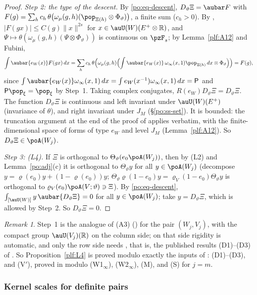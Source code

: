 \documentclass[10pt]{amsart}
\theoremstyle{definition}
\theoremstyle{remark}
\newtheorem{remark}[theorem]{Remark}
\newcommand{\R}{\mathbb R}
\begin{document}
\begin{proof}
\emph{Step 2: the type of the descent.} By \eqref{po:eq-descent}, $D_\vartheta\Xi=\aubar F$ with
$F(g)=\sum_hc_h\,\theta\bigl(\omega_\mu(g,h)(\pop_{\Xi(h)}\otimes\Phi_\vartheta)\bigr)$, a finite sum
($c_h>0$). By {\cite[Lemma~8.2]{P49}}, $|F(gx)|\le C(g)\|x\|^{2s}$ for $x\in\auU(W)(E^+\otimes\R)$, and
$\Psi\mapsto\theta(\omega_\mu(g,h)(\Psi\otimes\Phi_\vartheta))$ is continuous on $\pzF_s$; by
Lemma~\ref{plf:A12} and Fubini,
\[
\int\aubar{e_W(x)}F(gx)\,dx=\sum_hc_h\,\theta\Bigl(\omega_\mu(g,h)\Bigl(\int\aubar{e_W(x)}\,
\omega_\infty(x,1)\pop_{\Xi(h)}\,dx\otimes\Phi_\vartheta\Bigr)\Bigr)=F(g),
\]
since $\int\aubar{e_W(x)}\omega_\infty(x,1)\,dx=\int e_W(x^{-1})\omega_\infty(x,1)\,dx=\mathsf P$ and
$\mathsf P\pop_\xi=\pop_\xi$ by Step~1. Taking complex conjugates, $R(e_W)D_\vartheta\Xi=D_\vartheta\Xi$.
The function $D_\vartheta\Xi$ is continuous and left invariant under $\auU(W)(E^+)$ (invariance of
$\theta$), and right invariant under $J_M$ (\S\ref{po:ss-set}). It is bounded: the truncation
argument at the end of the proof of {\cite[Proposition~8.4(b)]{P49}} applies verbatim, with the
finite-dimensional space of forms of type $e_W$ and level $J_M$ (Lemma~\ref{plf:A12}). So
$D_\vartheta\Xi\in\poA(W_j)$.

\emph{Step 3: (L4).} If $\Xi$ is orthogonal to $\Theta_\vartheta(e_0\poA(W_j))$, then by (L2) and
Lemma~\ref{po:adj}(c) it is orthogonal to $\Theta_\vartheta y$ for all $y\in\poA(W_j)$ (decompose
$y=\varrho(e_0)y+(1-\varrho(e_0))y$; $\Theta_\vartheta\varrho(1-e_0)y=\varrho_V(1-e_0)\Theta_\vartheta y$
is orthogonal to $\varrho_V(e_0)\poA(V;\vartheta)\ni\Xi$). By \eqref{po:eq-descent},
$\int_{[\auU(W)]}y\,\aubar{D_\vartheta\Xi}=0$ for all $y\in\poA(W_j)$; take $y=D_\vartheta\Xi$, which is
allowed by Step~2. So $D_\vartheta\Xi=0$.
\end{proof}

\begin{remark}\label{plf:rem-L4}
Step~1 is the analogue of (A3) ({\cite[Theorem~3.15]{P49}}) for the pair $(W_j,V_j)$, with the compact
group $\auU(V_j)(\R)$ on the column side; on that side rigidity is automatic, and only the row side
needs {\cite[Lemma~3.5]{P49}}, that is, the published results (D1)--(D3) of {\cite[\S3.1.3]{P49}}. So
Proposition~\ref{plf:L4} is proved modulo exactly the inputs of {\cite[Theorem~3.15]{P49}}: (D1)--(D3),
and (V$'$), proved in {\cite[Theorem~3.29]{P49}} modulo (W1$_\infty$), (W2$_\infty$), (M), and (S) for
$j=m$.
\end{remark}

\subsubsection{Kernel scales for definite pairs}\label{plf:ss-KS}
\end{document}

